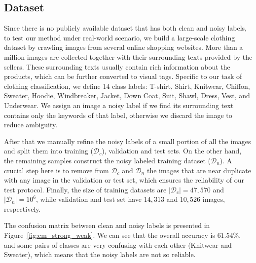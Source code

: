 \documentclass[10pt,twocolumn,letterpaper]{article}
\begin{document}
\subsection{Dataset} %
\label{sub:dataset}
Since there is no publicly available dataset that has both clean and noisy labels, to test our method under real-world scenario, we build a large-scale clothing dataset by crawling images from several online shopping websites. More than a million images are collected together with their surrounding texts provided by the sellers. These surrounding texts usually contain rich information about the products, which can be further converted to visual tags. Specific to our task of clothing classification, we define $14$ class labels: T-shirt, Shirt, Knitwear, Chiffon, Sweater, Hoodie, Windbreaker, Jacket, Down Coat, Suit, Shawl, Dress, Vest, and Underwear. We assign an image a noisy label if we find its surrounding text contains only the keywords of that label, otherwise we discard the image to reduce ambiguity.

After that we manually refine the noisy labels of a small portion of all the images and split them into training ($\mathcal{D}_c$), validation and test sets. On the other hand, the remaining samples construct the noisy labeled training dataset ($\mathcal{D}_n$). A crucial step here is to remove from $\mathcal{D}_c$ and $\mathcal{D}_n$ the images that are near duplicate with any image in the validation or test set, which ensures the reliability of our test protocol. Finally, the size of training datasets are $|\mathcal{D}_c| = 47,570$ and $|\mathcal{D}_n| = 10^6$, while validation and test set have $14,313$ and $10,526$ images, respectively.

The confusion matrix between clean and noisy labels is presented in Figure~\ref{fig:cm_strong_weak}. We can see that the overall accuracy is $61.54\%$, and some pairs of classes are very confusing with each other (\eg Knitwear and Sweater), which means that the noisy labels are not so reliable.
\end{document}
